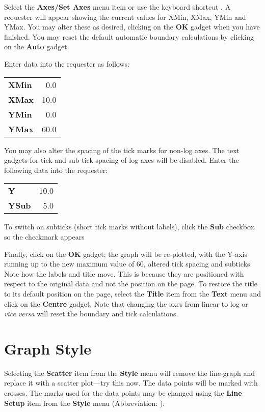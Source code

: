 Select the {\bf Axes/Set Axes} menu item or use the keyboard shortcut
. A requester will appear showing the current values for XMin, 
XMax, YMin and YMax. You may alter these as desired, clicking on the {\bf OK} gadget 
when you have finished. You may reset the default automatic boundary calculations 
by clicking on the {\bf Auto} gadget.

Enter data into the requester as follows:

\begin{tabular}{lr}
{\bf XMin} &  0.0 \\
{\bf XMax} & 10.0 \\
{\bf YMin} &  0.0 \\
{\bf YMax} & 60.0 \\
\end{tabular}

\noindent You may also alter the spacing of the tick marks for 
non-log axes. 
The text gadgets for tick and sub-tick spacing of log axes will be disabled.
Enter the following data into the requester:

\begin{tabular}{lr}
{\bf Y}     & 10.0   \\
{\bf YSub}  &  5.0   \\
\end{tabular}

\noindent To switch on subticks (short tick marks without labels), click the 
{\bf Sub} checkbox so the checkmark appears

Finally, click on the {\bf OK} gadget; the graph will be re-plotted, with the
Y-axis running up to the new maximum value of 60, altered tick spacing and subticks.
Note how the labels and title move. This is because they are positioned with respect 
to the original data and not the position on the page. To restore the title to its 
default position on the page, select the {\bf Title} item from the {\bf Text} menu 
and click on the {\bf Centre} gadget. Note that changing the axes from linear to log 
or {\em vice versa\/} will reset the boundary and tick calculations.







\section{Graph Style}
Selecting the {\bf Scatter} item from the
{\bf Style} menu will remove the 
line-graph and replace it with a scatter plot---try this now. The data points
will be marked with crosses. The marks used for the data points may be changed
using the {\bf Line Setup} item from the {\bf Style}
menu (Abbreviation: ).


